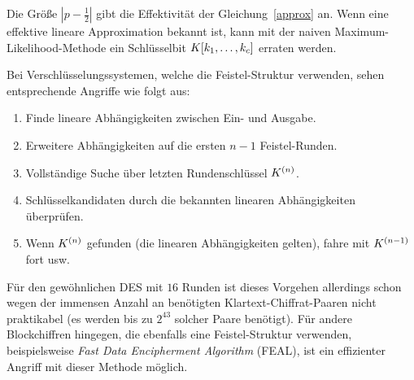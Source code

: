 Die Größe $\left|{p-\frac{1}{2}}\right|$ gibt die Effektivität der
Gleichung~\ref{approx} an. Wenn eine effektive lineare Approximation
bekannt ist, kann mit der naiven Maximum-Likelihood-Methode ein
Schlüsselbit $K[k_1,\dots, k_c]$ erraten werden. 

Bei Verschlüsselungssystemen, welche die Feistel-Struktur\indexFeistel
verwenden, sehen entsprechende Angriffe wie folgt aus: 
\begin{enumerate}
\item Finde lineare Abhängigkeiten zwischen Ein- und Ausgabe.
\item Erweitere Abhängigkeiten auf die ersten $n-1$ Feistel-Runden.
\item Vollständige Suche über letzten Rundenschlüssel $K^{(n)}$.
\item Schlüsselkandidaten durch die bekannten linearen Abhängigkeiten überprüfen.
\item Wenn $K^{(n)}$ gefunden (\dh die linearen Abhängigkeiten
  gelten), fahre mit $K^{(n-1)}$ fort usw. 
\end{enumerate}

Für den gewöhnlichen DES mit $16$ Runden ist dieses Vorgehen allerdings
schon wegen der immensen Anzahl an benötigten Klartext-Chiffrat-Paaren
nicht praktikabel (es werden bis zu $2^{43}$ solcher Paare
benötigt). Für andere Blockchiffren hingegen, die ebenfalls eine
Feistel-Struktur verwenden, beispielsweise \emph{Fast Data Encipherment
  Algorithm} (FEAL), ist ein effizienter Angriff mit dieser Methode
möglich. 

